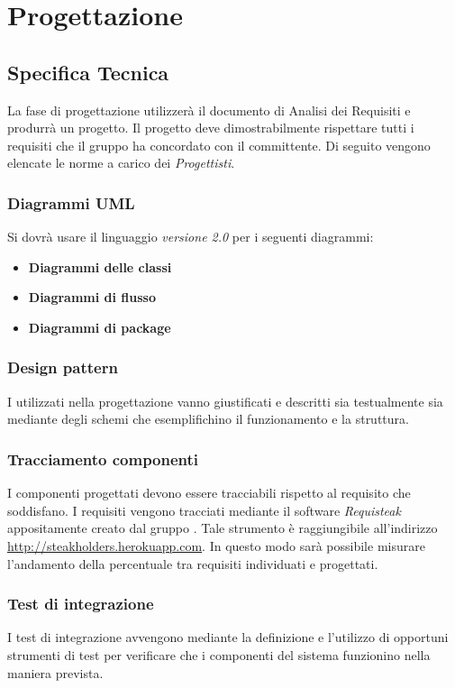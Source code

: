 \section{Progettazione}
\subsection{Specifica Tecnica}
La fase di progettazione utilizzerà il documento di Analisi dei Requisiti e produrrà un progetto. Il progetto deve dimostrabilmente rispettare tutti i requisiti che il gruppo ha concordato con il committente.
Di seguito vengono elencate le norme a carico dei \emph{Progettisti}.

	\subsubsection{Diagrammi UML}
	Si dovrà usare il linguaggio  \emph{versione 2.0} per i seguenti diagrammi:
\begin{itemize}
 \item \textbf{Diagrammi delle classi} %
 \item \textbf{Diagrammi di flusso} %
 \item \textbf{Diagrammi di package} %
\end{itemize}

	\subsubsection{Design pattern}
	I  utilizzati nella progettazione vanno giustificati e descritti sia testualmente sia mediante degli schemi che esemplifichino il funzionamento e la struttura.

	\subsubsection{Tracciamento componenti}
	I componenti progettati devono essere tracciabili rispetto al requisito che soddisfano. I requisiti vengono tracciati mediante il software \emph{Requisteak} appositamente creato dal gruppo \GroupName . Tale strumento è raggiungibile all'indirizzo \url{http://steakholders.herokuapp.com}. In questo modo sarà possibile misurare l'andamento della percentuale tra requisiti individuati e progettati.
	 
	\subsubsection{Test di integrazione}
	I test di integrazione avvengono mediante la definizione e l'utilizzo di opportuni strumenti di test per verificare che i componenti del sistema funzionino nella maniera prevista.

